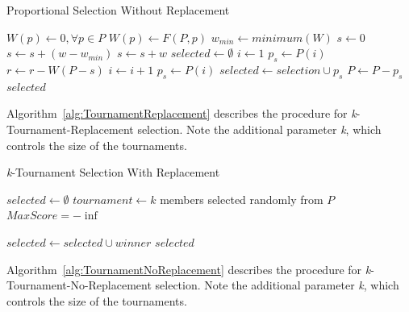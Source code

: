 \documentclass[sigconf]{acmart}
\begin{document}
\begin{algorithm}
	\caption{Proportional Selection Without Replacement}
	\label{alg:ProportionalNoReplacement}
	\begin{algorithmic}[1]
		 \label{proc:ProportionalNoReplacement}
		\State $W(p) \leftarrow 0,\forall p \in P$
		\State $W(p) \leftarrow F(P,p)$
		\EndFor
		\State $w_{min} \leftarrow minimum(W)$	
		\State $s \leftarrow 0$
		\State $s \leftarrow s + (w - w_{min} )$			
		\Else
		\State $s \leftarrow s + w$		
		\EndIf	
		\EndFor
		\State $selected \leftarrow \emptyset$
		\State $i \leftarrow 1$
		\State $p_s \leftarrow P(i)$
		\State $r \leftarrow r - W(P-s)$
		\State $i \leftarrow i + 1$
		\State $p_s \leftarrow P(i)$
		\EndWhile	
		\State $selected \leftarrow selection \cup p_s$
		\State $P \leftarrow P - p_s$
		\EndFor
		\State \Return $selected$
		\EndFunction
	\end{algorithmic}
\end{algorithm}

Algorithm~\ref{alg:TournamentReplacement} describes the procedure for \textit{k}-Tournament-Replacement selection. Note the additional parameter \textit{k}, which controls the size of the tournaments.

\begin{algorithm}
	\caption{\textit{k}-Tournament Selection With Replacement}
	\label{alg:TournamentReplacement}
	\begin{algorithmic}[1]
		 \label{proc:TournamentReplacement}
		\State $selected \leftarrow \emptyset$
		\State $tournament \leftarrow k$ members selected randomly from $P$
		\State $MaxScore = -\inf$
		
		\EndIf			
		\EndFor
		\State $selected \leftarrow selected \cup winner$
		\EndFor
		\State \Return $selected$
		\EndFunction
	\end{algorithmic}
\end{algorithm}

Algorithm~\ref{alg:TournamentNoReplacement} describes the procedure for \textit{k}-Tournament-No-Replacement selection. Note the additional parameter \textit{k}, which controls the size of the tournaments.
\end{document}
